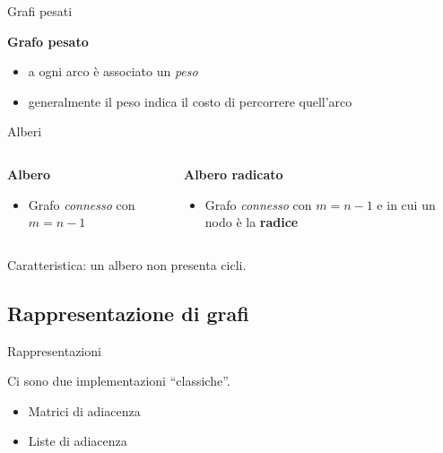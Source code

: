 \documentclass[compress]{beamer}
\begin{document}
\begin{frame}{Grafi pesati}
  \begin{block}{\textbf{Grafo pesato}}
    \begin{itemize}
      \item a ogni arco \`e associato un \emph{peso}
      \item generalmente il peso indica il costo di percorrere quell'arco
    \end{itemize}
  \end{block}
  \begin{center}
  
  \end{center}
\end{frame}

\begin{frame}{Alberi}
  \begin{columns}
    \begin{block}{\textbf{Albero}}
      \begin{itemize}
      \item Grafo \emph{connesso} con $m = n - 1$
      \end{itemize}
    \end{block}
    \begin{center}
    \scalebox{0.7}{}
    \end{center}
    \begin{block}{\textbf{Albero radicato}}
      \begin{itemize}
          \item Grafo \emph{connesso} con $m = n - 1$ e in cui un nodo \`e la \textbf{radice}
      \end{itemize}
    \end{block}
    \begin{center}
    \scalebox{0.8}{}
    \end{center}
  \end{columns}
  Caratteristica: un albero non presenta cicli.
\end{frame}

\subsection{Rappresentazione di grafi}

\begin{frame}{Rappresentazioni}
  \begin{block}{}
    Ci sono due implementazioni ``classiche''.
  \end{block}
  \begin{itemize}
      \pause
    \item Matrici di adiacenza
    \item Liste di adiacenza
  \end{itemize}
\end{frame}
\end{document}
